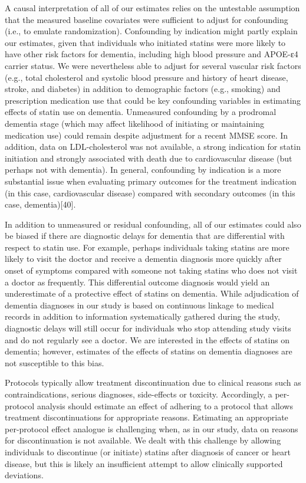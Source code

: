 \documentclass[
]{book}
\begin{document}
A causal interpretation of all of our estimates relies on the untestable assumption that the measured baseline covariates were sufficient to adjust for confounding (i.e., to emulate randomization). Confounding by indication might partly explain our estimates, given that individuals who initiated statins were more likely to have other risk factors for dementia, including high blood pressure and APOE-ε4 carrier status. We were nevertheless able to adjust for several vascular risk factors (e.g., total cholesterol and systolic blood pressure and history of heart disease, stroke, and diabetes) in addition to demographic factors (e.g., smoking) and prescription medication use that could be key confounding variables in estimating effects of statin use on dementia. Unmeasured confounding by a prodromal dementia stage (which may affect likelihood of initiating or maintaining medication use) could remain despite adjustment for a recent MMSE score. In addition, data on LDL-cholesterol was not available, a strong indication for statin initiation and strongly associated with death due to cardiovascular disease (but perhaps not with dementia). In general, confounding by indication is a more substantial issue when evaluating primary outcomes for the treatment indication (in this case, cardiovascular disease) compared with secondary outcomes (in this case, dementia){[}40{]}.

In addition to unmeasured or residual confounding, all of our estimates could also be biased if there are diagnostic delays for dementia that are differential with respect to statin use. For example, perhaps individuals taking statins are more likely to visit the doctor and receive a dementia diagnosis more quickly after onset of symptoms compared with someone not taking statins who does not visit a doctor as frequently. This differential outcome diagnosis would yield an underestimate of a protective effect of statins on dementia. While adjudication of dementia diagnoses in our study is based on continuous linkage to medical records in addition to information systematically gathered during the study, diagnostic delays will still occur for individuals who stop attending study visits and do not regularly see a doctor. We are interested in the effects of statins on dementia; however, estimates of the effects of statins on dementia diagnoses are not susceptible to this bias.

Protocols typically allow treatment discontinuation due to clinical reasons such as
contraindications, serious diagnoses, side-effects or toxicity. Accordingly, a per-protocol analysis should estimate an effect of adhering to a protocol that allows treatment discontinuations for appropriate reasons. Estimating an appropriate per-protocol effect analogue is challenging when, as in our study, data on reasons for discontinuation is not available. We dealt with this challenge by allowing individuals to discontinue (or initiate) statins after diagnosis of cancer or heart disease, but this is likely an insufficient attempt to allow clinically supported deviations.
\end{document}
